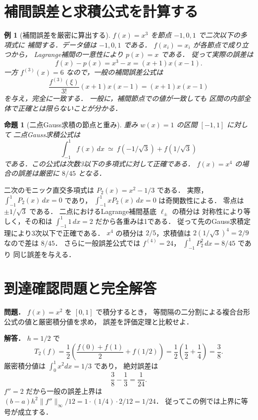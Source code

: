\documentclass[a5paper,10pt,onecolumn]{jsarticle}
\makeatletter
\theoremstyle{mathnotetheorem}
\newtheorem{proposition}[theorem]{命題}
\newtheorem{example}[theorem]{例}
\renewcommand{\proofname}{証明}
\renewenvironment{proof}[1][\proofname]{%
  \par\pushQED{\qed}\normalfont\topsep4\p@\@plus2\p@\relax
  \trivlist\item[\hskip\labelsep\bfseries #1]\ignorespaces
}{\popQED\endtrivlist\@endpefalse}
\makeatother
\begin{document}
\section{補間誤差と求積公式を計算する}
\begin{example}[補間誤差を厳密に算出する]\label{ex:interp-cubic}
$f(x)=x^3$ を節点 $-1,0,1$ で二次以下の多項式に
補間する．データ値は $-1,0,1$ である．
$f(x_i)=x_i$ が各節点で成り立つから，
Lagrange補間の一意性により $p(x)=x$ である．
従って実際の誤差は
\[
 f(x)-p(x)=x^3-x=(x+1)x(x-1).
\]
一方 $f^{(3)}(x)=6$ なので，一般の補間誤差公式は
\[
 \frac{f^{(3)}(\xi)}{3!}(x+1)x(x-1)
 =(x+1)x(x-1)
\]
を与え，完全に一致する．
一般に，補間節点での値が一致しても
区間の内部全体で正確とは限らないことが分かる．
\end{example}
\begin{proposition}[二点Gauss求積の節点と重み]\label{prop:gauss2}
重み $w(x)=1$ の区間 $[-1,1]$ に対して
二点Gauss求積公式は
\[
 \int_{-1}^1f(x)\,dx
 \ \simeq\
 f(-1/\sqrt3)+f(1/\sqrt3)
\]
である．この公式は次数3以下の多項式に対して正確である．
$f(x)=x^4$ の場合の誤差は厳密に $8/45$ となる．
\end{proposition}
\begin{proof}
二次のモニック直交多項式は
$P_2(x)=x^2-1/3$ である．
実際，$\int_{-1}^1P_2(x)\,dx=0$ であり，
$\int_{-1}^1xP_2(x)\,dx=0$ は奇関数性による．
零点は $\pm1/\sqrt3$ である．
二点におけるLagrange補間基底 $\ell_\pm$ の積分は
対称性により等しく，その和は
$\int_{-1}^1 1\,dx=2$ だから各重みは1である．
従って先のGauss求積定理により3次以下で正確である．
$x^4$ の積分は $2/5$，求積値は
$2(1/\sqrt3)^4=2/9$ なので差は $8/45$．
さらに一般誤差公式では
$f^{(4)}=24$，
$\int_{-1}^1P_2^2\,dx=8/45$ であり
同じ誤差を与える．
\end{proof}
\section*{到達確認問題と完全解答}
\noindent\textbf{問題．}
$f(x)=x^2$ を $[0,1]$ で積分するとき，
等間隔の二分割による複合台形公式の値と厳密積分値を求め，
誤差を評価定理と比較せよ．

\medskip\noindent\textbf{解答．}
$h=1/2$ で
\[
 T_2(f)=\frac12\left(
 \frac{f(0)+f(1)}2+f(1/2)\right)
 =\frac12\left(\frac12+\frac14\right)=\frac38.
\]
厳密積分値は $\int_0^1x^2dx=1/3$ であり，
絶対誤差は
\[
 \frac38-\frac13=\frac1{24}.
\]
$f''=2$ だから一般の誤差上界は
$(b-a)h^2\|f''\|_\infty/12
 =1\cdot(1/4)\cdot2/12=1/24$．
従ってこの例では上界に等号が成立する．
\end{document}
